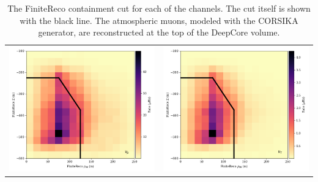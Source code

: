 \begin{center}
\begin{table}
\begin{tabular}{cc}
    \includegraphics[width=0.45\linewidth]{z_rho_genie_numu.png} &  
    \includegraphics[width=0.45\linewidth]{z_rho_genie_nutau.png} \\ 
\end{tabular}
\label{fig:finitereco_zVsRho}
\caption[The FiniteReco containment cut applied at GRECO Level 6]{The FiniteReco containment cut for each of the channels. The cut itself is shown with the black line. The atmospheric muons, modeled with the CORSIKA generator, are reconstructed at the top of the DeepCore volume.}
\end{table}
\end{center}


